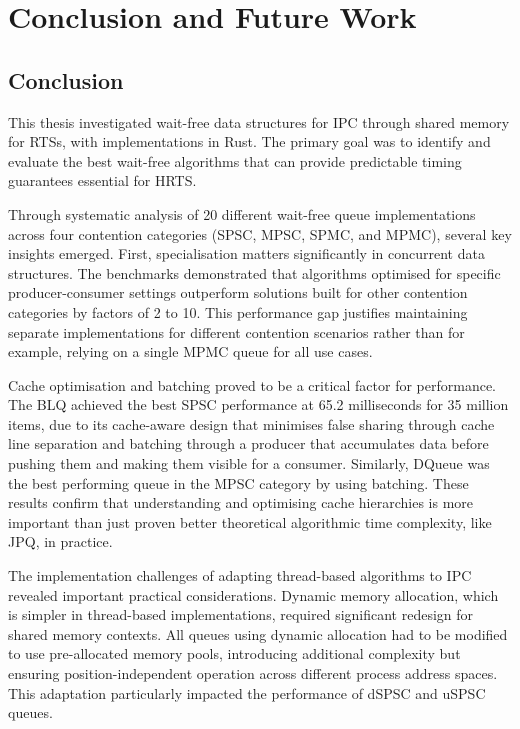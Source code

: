 \chapter{Conclusion and Future Work}\label{ch:conclusion}

\section{Conclusion}

This thesis investigated wait-free data structures for \ac{IPC} through shared memory for \acsp{RTS}, with implementations in Rust. The primary goal was to identify and evaluate the best wait-free algorithms that can provide predictable timing guarantees essential for \ac{HRTS}.

Through systematic analysis of 20 different wait-free queue implementations across four contention categories (\ac{SPSC}, \ac{MPSC}, \ac{SPMC}, and \ac{MPMC}), several key insights emerged. First, specialisation matters significantly in concurrent data structures. The benchmarks demonstrated that algorithms optimised for specific producer-consumer settings outperform solutions built for other contention categories by factors of 2 to 10. This performance gap justifies maintaining separate implementations for different contention scenarios rather than for example, relying on a single \ac{MPMC} queue for all use cases.

Cache optimisation and batching proved to be a critical factor for performance. The \acf{BLQ} achieved the best \ac{SPSC} performance at 65.2 milliseconds for 35 million items, due to its cache-aware design that minimises false sharing through cache line separation and batching through a producer that accumulates data before pushing them and making them visible for a consumer. Similarly, DQueue was the best performing queue in the \ac{MPSC} category by using batching. These results confirm that understanding and optimising cache hierarchies is more important than just proven better theoretical algorithmic time complexity, like \ac{JPQ}, in practice.

The implementation challenges of adapting thread-based algorithms to \ac{IPC} revealed important practical considerations. Dynamic memory allocation, which is simpler in thread-based implementations, required significant redesign for shared memory contexts. All queues using dynamic allocation had to be modified to use pre-allocated memory pools, introducing additional complexity but ensuring position-independent operation across different process address spaces. This adaptation particularly impacted the performance of \ac{dSPSC} and \ac{uSPSC} queues.


